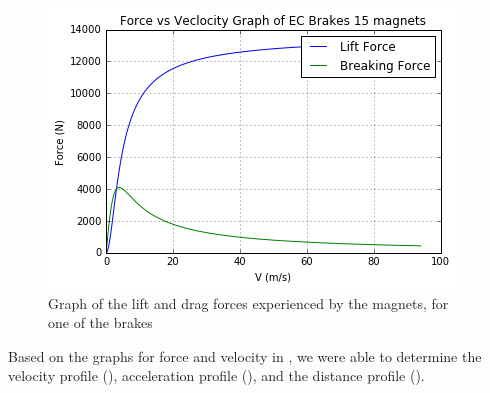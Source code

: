 \documentclass[main.tex]{subfiles}
\begin{document}
    \begin{figure}[H]
        \centering
        \includegraphics[width=\linewidth]{images/force_velocity_graph.png}
        \caption{Graph of the lift and drag forces experienced by the magnets, for one of the brakes}
        \label{fig:force-velocity-graph}
    \end{figure}
    Based on the graphs for force and velocity in , we were able to determine the velocity profile (), acceleration profile (), and the distance profile ().\\
\end{document}
